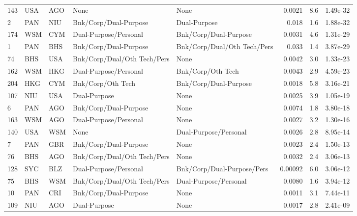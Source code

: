 {\begin{longtable}{@{}lllp{3cm}p{3cm}rrr@{}}
143 & USA & AGO & None                        & None                        & 0.0021   & 8.6       & 1.49e-32  \\
2   & PAN & NIU & Bnk/Corp/Dual-Purpose       & Dual-Purpose                & 0.018    & 1.6       & 1.88e-32  \\
174 & WSM & CYM & Dual-Purpose/Personal       & Bnk/Corp/Dual-Purpose       & 0.0031   & 4.6       & 1.31e-29  \\
1   & PAN & BHS & Bnk/Corp/Dual-Purpose       & Bnk/Corp/Dual/Oth Tech/Pers & 0.033    & 1.4       & 3.87e-29  \\
74  & BHS & USA & Bnk/Corp/Dual/Oth Tech/Pers & None                        & 0.0042   & 3.0       & 1.33e-23  \\
162 & WSM & HKG & Dual-Purpose/Personal       & Bnk/Corp/Oth Tech           & 0.0043   & 2.9       & 4.59e-23  \\
204 & HKG & CYM & Bnk/Corp/Oth Tech           & Bnk/Corp/Dual-Purpose       & 0.0018   & 5.8       & 3.16e-21  \\
107 & NIU & USA & Dual-Purpose                & None                        & 0.0025   & 3.9       & 1.05e-19  \\
6   & PAN & AGO & Bnk/Corp/Dual-Purpose       & None                        & 0.0074   & 1.8       & 3.80e-18  \\
163 & WSM & AGO & Dual-Purpose/Personal       & None                        & 0.0027   & 3.2       & 1.30e-16  \\
140 & USA & WSM & None                        & Dual-Purpose/Personal       & 0.0026   & 2.8       & 8.95e-14  \\
7   & PAN & GBR & Bnk/Corp/Dual-Purpose       & None                        & 0.0023   & 2.4       & 1.50e-13  \\
76  & BHS & AGO & Bnk/Corp/Dual/Oth Tech/Pers & None                        & 0.0032   & 2.4       & 3.06e-13  \\
128 & SYC & BLZ & Dual-Purpose/Personal       & Bnk/Corp/Dual-Purpose/Pers  & 0.00092  & 6.0       & 3.06e-12  \\
75  & BHS & WSM & Bnk/Corp/Dual/Oth Tech/Pers & Dual-Purpose/Personal       & 0.0080   & 1.6       & 3.94e-12  \\
10  & PAN & CRI & Bnk/Corp/Dual-Purpose       & None                        & 0.0011   & 3.1       & 7.44e-11  \\
109 & NIU & AGO & Dual-Purpose                & None                        & 0.0017   & 2.8       & 2.41e-09  \\

\end{longtable}}
